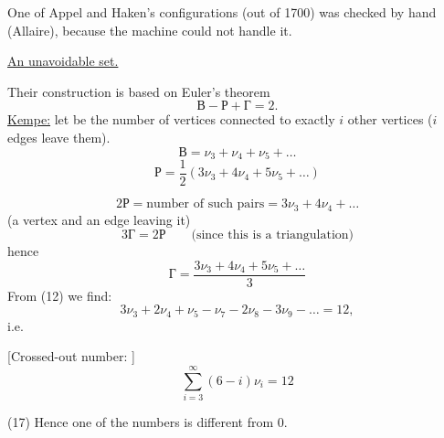 One of Appel and Haken's configurations (out of 1700) was checked
by hand (Allaire), because the machine could not handle it.

\underline{An unavoidable set.}

Their construction is based on Euler's theorem
\begin{equation*}
\mathrm{В}-\mathrm{Р}+\mathrm{Г}=2.\tag{12}
\end{equation*}
\underline{Kempe:} let  be the number of vertices connected to exactly
$i$ other vertices ($i$ edges leave them).
\begin{equation*}
\mathrm{В}=\nu_3+\nu_4+\nu_5+\ldots\tag{13}
\end{equation*}
\begin{equation*}
\mathrm{Р}=\frac{1}{2}(3\nu_3+4\nu_4+5\nu_5+\ldots)\tag{14}
\end{equation*}
\begin{center}
\end{center}
\begin{equation*}
2\mathrm{Р}=\text{number of such pairs}=3\nu_3+4\nu_4+\ldots
\end{equation*}
(a vertex and an edge leaving it)
\begin{equation*}
3\mathrm{Г}=2\mathrm{Р}\qquad\text{(since this is a triangulation)}\tag{15}
\end{equation*}
hence
\begin{equation*}
\mathrm{Г}=\frac{3\nu_3+4\nu_4+5\nu_5+\ldots}{3}\tag{15'}
\end{equation*}
From (12) we find:
\begin{equation*}
3\nu_3+2\nu_4+\nu_5-\nu_7-2\nu_8-3\nu_9-\ldots=12,\tag{16}
\end{equation*}
i.e.

[Crossed-out number: ]
\begin{equation*}
\sum_{i=3}^{\infty}(6-i)\nu_i=12\tag{16'}
\end{equation*}



(17) Hence one of the numbers  is different from $0$.

